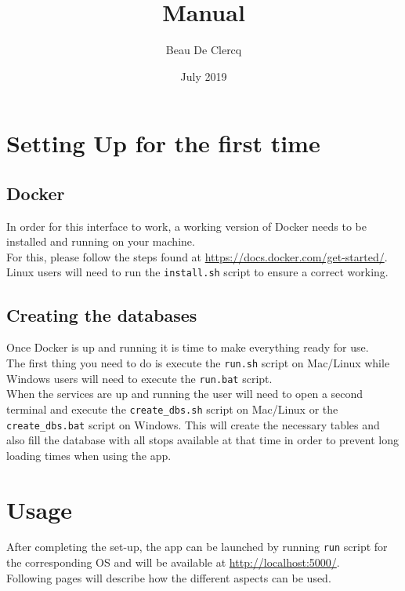 \documentclass[12pt]{article}
\title{Manual}
\author{Beau De Clercq}
\date{July 2019}
\begin{document}
\maketitle{}

\tableofcontents

\clearpage
\newpage

\section{Setting Up for the first time}
\subsection{Docker}
In order for this interface to work, a working version of Docker needs to be installed and running on your machine.\\
For this, please follow the steps found at \url{https://docs.docker.com/get-started/}.\\
Linux users will need to run the \texttt{install.sh} script to ensure a correct working.

\subsection{Creating the databases}
Once Docker is up and running it is time to make everything ready for use.\\
The first thing you need to do is execute the \texttt{run.sh} script on Mac/Linux while Windows users will need to execute the \texttt{run.bat} script.\\
When the services are up and running the user will need to open a second terminal and execute the \texttt{create\_dbs.sh} script on Mac/Linux or the \texttt{create\_dbs.bat} script on Windows. This  will create the necessary tables and also fill the database with all stops available at that time in order to prevent long loading times when using the app.
\newpage

\section{Usage}
After completing the set-up, the app can be launched by running \texttt{run} script for the corresponding OS and will be available at \url{http://localhost:5000/}.\\
Following pages will describe how the different aspects can be used.
\newpage
\end{document}
